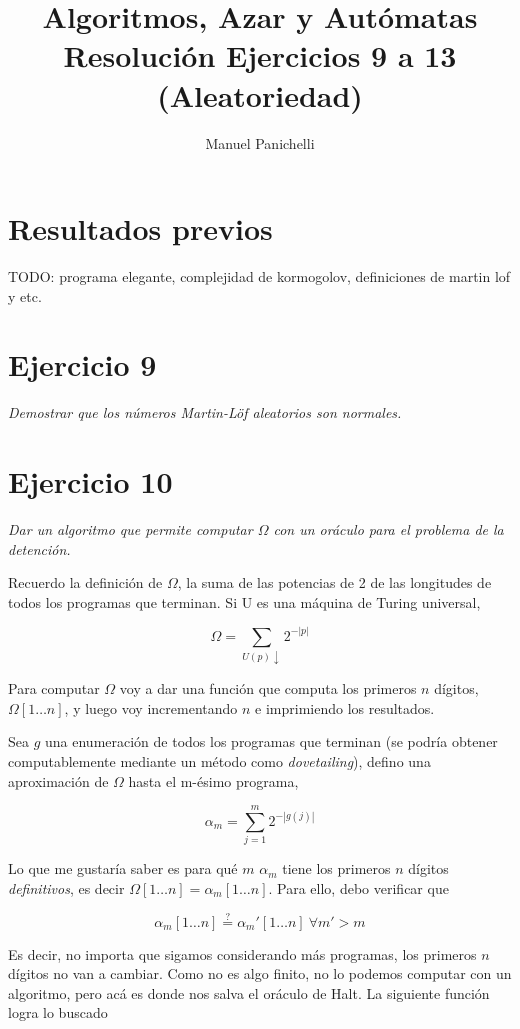 \documentclass{article}
\author{Manuel Panichelli}
\title{Algoritmos, Azar y Autómatas\\Resolución Ejercicios 9 a 13 (Aleatoriedad)}
\theoremstyle{definition} %
\newcommand{\progends}{\downarrow}
\newcommand{\firstn}[1]{\first{n}{#1}}
\newcommand{\first}[2]{#2[1 \dots #1]}
\begin{document}
\maketitle

\section*{Resultados previos}

TODO: programa elegante, complejidad de kormogolov, definiciones de martin lof y
etc.

\section*{Ejercicio 9}

\textit{Demostrar que los números Martin-Löf aleatorios son normales.}

\section*{Ejercicio 10}

\textit{Dar un algoritmo que permite computar $\Omega$ con un oráculo para el problema de la detención.}

Recuerdo la definición de $\Omega$, la suma de las potencias de 2 de las
longitudes de todos los programas que terminan. Si U es una máquina de Turing
universal,

\[
    \Omega = \sum_{U(p)\progends} 2 ^ {-|p|}
\]

Para computar $\Omega$ voy a dar una función que computa los primeros $n$
dígitos, $\firstn{\Omega}$, y luego voy incrementando $n$ e imprimiendo los
resultados.

Sea $g$ una enumeración de todos los programas que terminan (se
podría obtener computablemente mediante un método como \textit{dovetailing}),
defino una aproximación de $\Omega$ hasta el m-ésimo programa,

\[
    \alpha_m = \sum_{j = 1}^{m} 2 ^ {-|g(j)|}
\]

Lo que me gustaría saber es para qué $m$ $\alpha_m$ tiene los primeros $n$
dígitos \textit{definitivos}, es decir $\firstn{\Omega} = \firstn{\alpha_m}$.
Para ello, debo verificar que

\[
    \firstn{\alpha_m} \overset{?}{=} \firstn{\alpha_m'}\ \forall m' > m
\]

Es decir, no importa que sigamos considerando más programas, los primeros $n$
dígitos no van a cambiar. Como no es algo finito, no lo podemos computar con un
algoritmo, pero acá es donde nos salva el oráculo de Halt. La siguiente función
logra lo buscado
\end{document}
